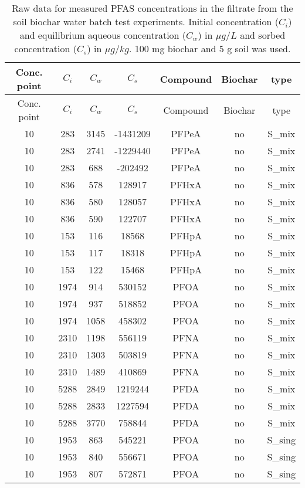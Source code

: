 \begin{longtable}[c]{ccccccc}
\caption{Raw data for measured PFAS concentrations in the filtrate from the soil biochar water batch test experiments. Initial concentration ($C_i$) and equilibrium aqueous concentration ($C_w$) in $\mu g/L$ and sorbed concentration ($C_s$) in $\mu g/kg$. 100 mg biochar and 5 g soil was used. \label{apptab:BC_soil_batchtests}} \\
\toprule
Conc. point & $C_i$ & $C_w$ & $C_s$ & Compound & Biochar & type \\ \midrule \endfirsthead \toprule
Conc. point & $C_i$ & $C_w$ & $C_s$ & Compound & Biochar & type \\ \midrule \endhead
10 & 283 & 3145 & -1431209 & PFPeA & no & S\_mix \\
10 & 283 & 2741 & -1229440 & PFPeA & no & S\_mix \\
10 & 283 & 688 & -202492 & PFPeA & no & S\_mix \\
10 & 836 & 578 & 128917 & PFHxA & no & S\_mix \\
10 & 836 & 580 & 128057 & PFHxA & no & S\_mix \\
10 & 836 & 590 & 122707 & PFHxA & no & S\_mix \\
10 & 153 & 116 & 18568 & PFHpA & no & S\_mix \\
10 & 153 & 117 & 18318 & PFHpA & no & S\_mix \\
10 & 153 & 122 & 15468 & PFHpA & no & S\_mix \\
10 & 1974 & 914 & 530152 & PFOA & no & S\_mix \\
10 & 1974 & 937 & 518852 & PFOA & no & S\_mix \\
10 & 1974 & 1058 & 458302 & PFOA & no & S\_mix \\
10 & 2310 & 1198 & 556119 & PFNA & no & S\_mix \\
10 & 2310 & 1303 & 503819 & PFNA & no & S\_mix \\
10 & 2310 & 1489 & 410869 & PFNA & no & S\_mix \\
10 & 5288 & 2849 & 1219244 & PFDA & no & S\_mix \\
10 & 5288 & 2833 & 1227594 & PFDA & no & S\_mix \\
10 & 5288 & 3770 & 758844 & PFDA & no & S\_mix \\
10 & 1953 & 863 & 545221 & PFOA & no & S\_sing \\
10 & 1953 & 840 & 556671 & PFOA & no & S\_sing \\
10 & 1953 & 807 & 572871 & PFOA & no & S\_sing \\

\end{longtable}
